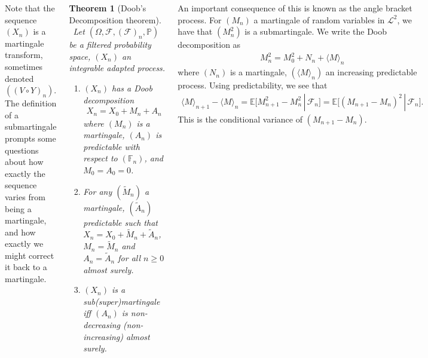 \documentclass{tikzposter} %
\newtheorem{theorem}{Theorem}
\begin{document}
\begin{columns}
{    Note that the sequence $(X_{n})$ is a martingale transform, sometimes denoted $((V \circ Y)_{n})$. \\

    The definition of a submartingale prompts some questions about how exactly the sequence varies from being a martingale, and how exactly we might correct it back to a martingale. \\

    \begin{theorem}[Doob's Decomposition theorem]
    \ Let $(\Omega, \mathcal{F}, (\mathcal{F})_{n},\mathbb{P})$ be a filtered probability space, $(X_{n})$ an integrable adapted process.
    \begin{enumerate}[label=\roman*.]
            \item $(X_{n})$ has a Doob decomposition
            \begin{align*}
              X_{n} = X_{0} + M_{n} + A_{n}
            \end{align*}
            where $(M_{n})$ is a martingale, $(A_{n})$ is predictable with respect to $(\mathbb{F}_{n})$, and $M_{0} = A_{0} = 0$.
            \item For any $(\widetilde{M}_{n})$ a martingale, $(\widetilde{A}_{n})$ predictable such that $X_{n} = X_{0} + \widetilde{M}_{n} + \widetilde{A}_{n}$, $M_{n} = \widetilde{M}_{n}$ and $A_{n} = \widetilde{A}_{n}$ for all $n \ge 0$ almost surely.
            \item $(X_{n})$ is a sub(super)martingale iff $(A_{n})$ is non-decreasing (non-increasing) almost surely.
    \end{enumerate}
    \end{theorem}
    \hphantom{}

    An important consequence of this is known as the angle bracket process. For $(M_{n})$ a martingale of random variables in $\mathcal{L}^{2}$, we have that $(M_{n}^{2})$ is a submartingale. We write the Doob decomposition as
    \begin{align*}
      M_{n}^{2} = M_{0}^{2}+N_{n}+\langle M \rangle_{n}
    \end{align*}
    where $(N_{n})$ is a martingale, $(\langle M \rangle_{n})$ an increasing predictable process. Using predictability, we see that
    \begin{align*}
      \langle M \rangle_{n+1} - \langle M \rangle_{n} = \mathbb{E}\big[M_{n+1}^{2}-M_{n}^{2}\,|\, \mathcal{F}_{n}\big] = \mathbb{E}\big[(M_{n+1}-M_{n})^{2}\,|\,\mathcal{F}_{n}\big].
    \end{align*}
    This is the conditional variance of $(M_{n+1}-M_{n})$. \\

}
\end{columns}
\end{document}
